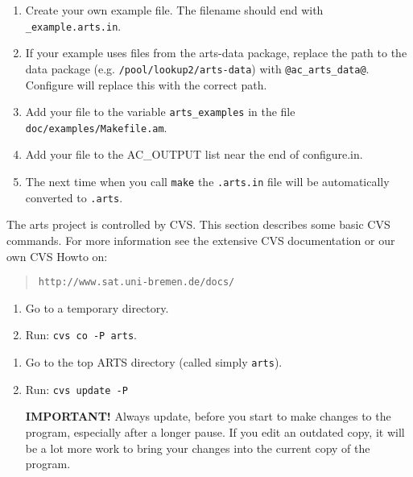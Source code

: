\begin{enumerate}
\item Create your own example file. The filename should end with
  \verb|_example.arts.in|.
\item If your example uses files from the arts-data package, replace
  the path to the data package (e.g. \verb|/pool/lookup2/arts-data|)
  with \verb|@ac_arts_data@|. Configure will replace this with the
  correct path.
\item Add your file to the variable \verb|arts_examples| in the file\newline
  \verb|doc/examples/Makefile.am|.
\item Add your file to the AC\_OUTPUT list near the end of configure.in.
\item The next time when you call \verb|make| the \verb|.arts.in| file will
  be automatically converted to \verb|.arts|.
\end{enumerate}


 \label{sec:development:cvs}

The arts project is controlled by CVS. This section describes some
basic CVS commands. For more information see the extensive CVS
documentation or our own CVS Howto on:
\begin{quote}
  \verb|http://www.sat.uni-bremen.de/docs/|
\end{quote}




\begin{enumerate}
\item Go to a temporary directory.
\item Run: \verb|cvs co -P arts|.
\end{enumerate}


\begin{enumerate}
\item Go to the top ARTS directory (called simply \verb|arts|).
\item Run: \verb|cvs update -P|
   
  \textbf{IMPORTANT!} Always update, before you start to make changes
  to the program, especially after a longer pause. If you edit an
  outdated copy, it will be a lot more work to bring your changes into
  the current copy of the program.
\end{enumerate}


